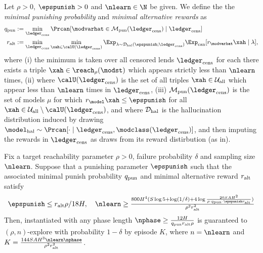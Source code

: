 \begin{definition}\label{asm:punish_asms_prob}
Let $\rho > 0$, $\epspunish > 0$ and $\nlearn \in \N$ be given. We define the the \emph{minimal punishing probability} and \emph{minimal alternative rewards} as
\begin{align}
\qpunish &:= \min_{\ledcens}\Prcan[\modvarhat \in \modpunish(\ledcens) \mid \ledcens]\\
\ralt &:= \min_{\ledcens}\min_{\xah \in \calU(\ledcens)}\Exp_{\lambda \sim \Dhalnol(\epspunish;\ledcens)}\Expcan[ r_{\modvarhat}\xah \mid \lambda ],
\end{align}
where (i) the minimum is taken over all censored lends $\ledcens$ for each there exists a triple $\xah \in \reach_{\rho}(\modst)$ which appears strictly less than $\nlearn$ times, (ii) where $\calU(\ledcens)$ is the set of all triples $\xah \in \Utot$ which appear less than $\nlearn$ times in $\ledcens$, (iii) $\modpunish(\ledcens)$ is the set of models $\mu$ for which $r_{\model}\xah \le \epspunish$ for all $\xah \in\Utot \setminus \calU(\ledcens)$, and where $\mathcal{D}_{\mathrm{hal}}$ is the hallucination distribution induced by drawing $\model_{\mathrm{hal}} \sim \Prcan[\cdot \mid \ledcens, \modclass(\ledcens)]$, and then imputing the rewards in $\ledcens$ as draws from its reward distirbution (as in).
\end{definition}
\begin{theorem}\label{thm:main_prob_mdp} Fix a target reachability parameter $\rho > 0$, failure probability $\delta$ and sampling size $\nlearn$. Suppose that a punishing parameter $\epspunish$ such that the associated minimal punish probability $q_{\mathrm{pun}}$ and minimal alternative reward $r_{\mathrm{alt}}$ satisfy
\begin{align*}
\textstyle \epspunish \le \ralt \rho/18H, \quad  \nlearn \ge \frac{800 H^4 (S\log 5 + \log(1/\delta) +  4\log \frac{20 SAH^2 }{\rho \cdot \qpunish \cdot \epspunish  \ralt })}{\rho^2 \ralt^2}
\end{align*}
Then,  instantiated with any phase length $\nphase \ge \frac{12 H}{\qpunish \ralt \rho}$ is guaranteed to $(\rho,n)$-explore with probability $1 - \delta$ by episode $K$, where $n = \nlearn$ and $K = \frac{144 SAH^3 \nlearn \nphase}{\rho^2 \ralt^2}$.
\end{theorem}
